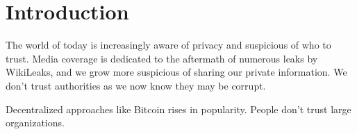 \chapter{Introduction}\label{cha:introduction}

The world of today is increasingly aware of privacy and suspicious of who to trust. Media coverage is dedicated to the aftermath of numerous leaks by WikiLeaks, and we grow more suspicious of sharing our private information. We don't trust authorities as we now know they may be corrupt.

Decentralized approaches like Bitcoin rises in popularity. People don't trust large organizations.




